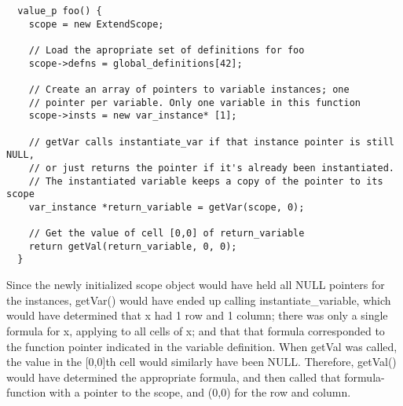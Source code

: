\begin{lstlisting}
  value_p foo() {
    scope = new ExtendScope;

    // Load the apropriate set of definitions for foo
    scope->defns = global_definitions[42];

    // Create an array of pointers to variable instances; one
    // pointer per variable. Only one variable in this function
    scope->insts = new var_instance* [1];

    // getVar calls instantiate_var if that instance pointer is still NULL,
    // or just returns the pointer if it's already been instantiated.
    // The instantiated variable keeps a copy of the pointer to its scope
    var_instance *return_variable = getVar(scope, 0);

    // Get the value of cell [0,0] of return_variable
    return getVal(return_variable, 0, 0);
  }
\end{lstlisting}
\medskip \noindent

Since the newly initialized scope object would have held all NULL pointers for the instances, getVar() would have ended up calling instantiate\_variable, which would have determined that x had 1 row and 1 column; there was only a single formula for x, applying to all cells of x; and that that formula corresponded to the function pointer indicated in the variable definition.
When getVal was called, the value in the [0,0]th cell would similarly have been NULL. Therefore, getVal() would have determined the appropriate formula, and then called that formula-function with a pointer to the scope, and (0,0) for the row and column.
